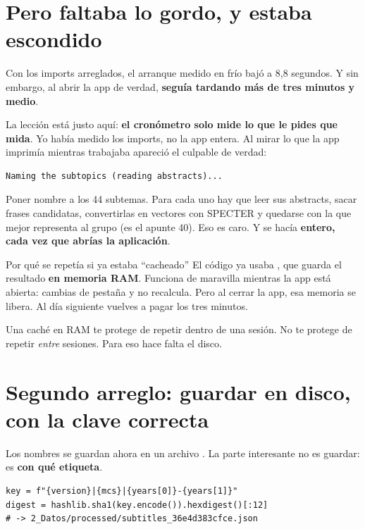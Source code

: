\documentclass[11pt,a4paper]{article}
\begin{document}
\section{Pero faltaba lo gordo, y estaba escondido}

Con los imports arreglados, el arranque medido en frío bajó a 8,8 segundos. Y sin
embargo, al abrir la app de verdad, \textbf{seguía tardando más de tres minutos y medio}.

La lección está justo aquí: \textbf{el cronómetro solo mide lo que le pides que mida}. Yo
había medido los imports, no la app entera. Al mirar lo que la app imprimía mientras
trabajaba apareció el culpable de verdad:

\begin{verbatim}
Naming the subtopics (reading abstracts)...
\end{verbatim}

Poner nombre a los 44 subtemas. Para cada uno hay que leer sus abstracts, sacar frases
candidatas, convertirlas en vectores con SPECTER y quedarse con la que mejor representa
al grupo (es el apunte 40). Eso es caro. Y se hacía \textbf{entero, cada vez que abrías
la aplicación}.

\begin{concepto}{Por qué se repetía si ya estaba ``cacheado''}
El código ya usaba , que guarda el resultado \textbf{en memoria
RAM}. Funciona de maravilla mientras la app está abierta: cambias de pestaña y no
recalcula. Pero al cerrar la app, esa memoria se libera. Al día siguiente vuelves a
pagar los tres minutos.

Una caché en RAM te protege de repetir dentro de una sesión. No te protege de repetir
\emph{entre} sesiones. Para eso hace falta el disco.
\end{concepto}

\section{Segundo arreglo: guardar en disco, con la clave correcta}

Los nombres se guardan ahora en un archivo . La parte interesante no es
guardar: es \textbf{con qué etiqueta}.

\begin{verbatim}
key = f"{version}|{mcs}|{years[0]}-{years[1]}"
digest = hashlib.sha1(key.encode()).hexdigest()[:12]
# -> 2_Datos/processed/subtitles_36e4d383cfce.json
\end{verbatim}
\end{document}
